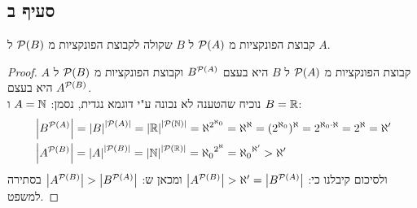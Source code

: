 \documentclass{article}
\begin{document}
	\subsection*{סעיף ב}
	קבוצת הפונקציות מ $\mathcal{P}(A)$ ל $B$ שקולה לקבוצת הפונקציות מ $\mathcal{P}(B)$ ל $A$.
	\begin{proof}
	קבוצת הפונקציות מ $\mathcal{P}(A)$ ל $B$ היא בעצם $B^{\mathcal{P}(A)}$ וקבוצת הפונקציות מ $\mathcal{P}(B)$ ל $A$ היא בעצם $A^{\mathcal{P}(B)}$. \\
	נוכיח שהטענה לא נכונה ע"י דוגמא נגדית, נסמן: $A = \mathbb{N}$ ו $B = \mathbb{R}$:
	\begin{align*}
		&\left| B^{\mathcal{P}(A)} \right| = \left| B \right|^{\left| \mathcal{P}(A) \right|} = {\left| \mathbb{R} \right|}^{\left| \mathcal{P}(\mathbb{N}) \right|} = \aleph^{2^{\aleph_0}} = \aleph^{\aleph} = (2^{\aleph_0})^\aleph = 2^{\aleph_0 \cdot \aleph} = 2^\aleph = \aleph' \\
		&\left| A^{\mathcal{P}(B)} \right| = \left| A \right|^{\left| \mathcal{P}(B) \right|} = \left| \mathbb{N} \right|^{\left| \mathcal{P}(\mathbb{R}) \right|} = {\aleph_0}^{2^\aleph} = {\aleph_0}^{\aleph'} > \aleph'
	\end{align*}
	ולסיכום קיבלנו כי: $\left| A^{\mathcal{P}(B)} \right| > \aleph' = \left| B^{\mathcal{P}(A)} \right|$ ומכאן ש: $\left| A^{\mathcal{P}(B)} \right| > \left| B^{\mathcal{P}(A)} \right|$
	בסתירה למשפט.
	\end{proof}

	\pagebreak
\end{document}
